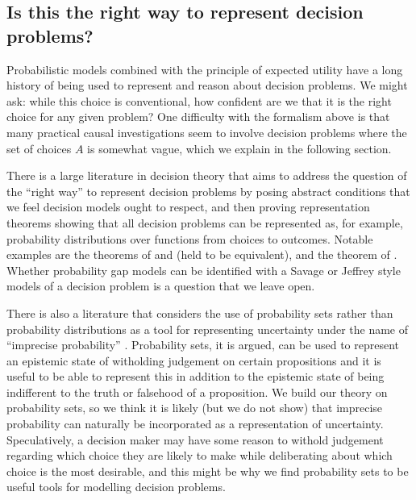 


\subsection{Is this the right way to represent decision problems?}

Probabilistic models combined with the principle of expected utility have a long history of being used to represent and reason about decision problems. We might ask: while this choice is conventional, how confident are we that it is the right choice for any given problem? One difficulty with the formalism above is that many practical causal investigations seem to involve decision problems where the set of choices $A$ is somewhat vague, which we explain in the following section.

There is a large literature in decision theory that aims to address the question of the ``right way'' to represent decision problems by posing abstract conditions that we feel decision models ought to respect, and then proving representation theorems showing that all decision problems can be represented as, for example, probability distributions over functions from choices to outcomes. Notable examples are the theorems of \citet{ramsey_truth_2016} and \citet{savage_foundations_1954} (held to be equivalent), and the theorem of \citet{bolker_functions_1966,jeffrey_logic_1990}. Whether probability gap models can be identified with a Savage or Jeffrey style models of a decision problem is a question that we leave open.

There is also a literature that considers the use of probability sets rather than probability distributions as a tool for representing uncertainty under the name of ``imprecise probability'' \citet{bradley_imprecise_2019,walley_statistical_1991}. Probability sets, it is argued, can be used to represent an epistemic state of witholding judgement on certain propositions and it is useful to be able to represent this in addition to the epistemic state of being indifferent to the truth or falsehood of a proposition. We build our theory on probability sets, so we think it is likely (but we do not show) that imprecise probability can naturally be incorporated as a representation of uncertainty. Speculatively, a decision maker may have some reason to withold judgement regarding which choice they are likely to make while deliberating about which choice is the most desirable, and this might be why we find probability sets to be useful tools for modelling decision problems.

